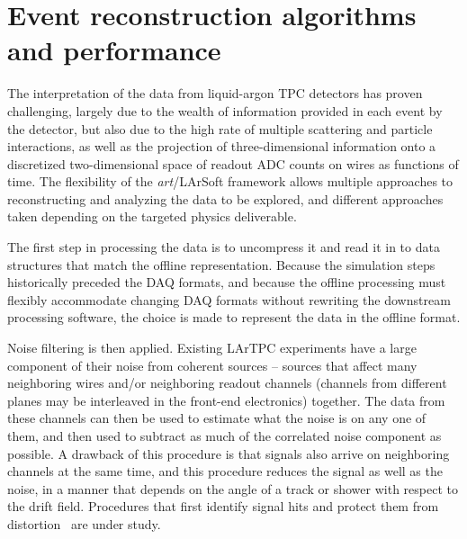 \section{Event reconstruction algorithms and performance}
\label{sec:larsoftreco}

The interpretation of the data from liquid-argon TPC detectors has
proven challenging, largely due to the wealth of information provided
in each event by the detector, but also due to the high rate of
multiple scattering and particle interactions, as well as the
projection of three-dimensional information onto a discretized
two-dimensional space of readout ADC counts on wires as functions of
time.  The flexibility of the {\it{art}}/LArSoft framework allows
multiple approaches to reconstructing and analyzing the data to be
explored, and different approaches taken depending on the targeted
physics deliverable.

The first step in processing the data is to uncompress it and read it
in to data structures that match the offline representation.  Because
the simulation steps historically preceded the DAQ formats, and
because the offline processing must flexibly accommodate changing DAQ
formats without rewriting the downstream processing software, the
choice is made to represent the data in the offline format.


Noise filtering is then applied.  Existing LArTPC experiments have a
large component of their noise from coherent sources -- sources that
affect many neighboring wires and/or neighboring readout channels
(channels from different planes may be interleaved in the front-end
electronics) together.  The data from these channels can then be used
to estimate what the noise is on any one of them, and then used to
subtract as much of the correlated noise component as possible.  A
drawback of this procedure is that signals also arrive on neighboring
channels at the same time, and this procedure reduces the signal as
well as the noise, in a manner that depends on the angle of a track or
shower with respect to the drift field.  Procedures that first
identify signal hits and protect them from
distortion~\cite{microboone_noise} are under study.

